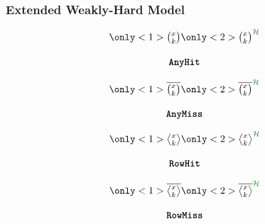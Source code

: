 \begin{frame}
    \frametitle{Extended Weakly-Hard Model}
    \begin{minipage}[c]{0.23\textwidth}
        \centering
        \begin{equation*}
            \begin{matrix}
                \only<1>{\Large \anyhit{}}%
                \only<2>{\Large \anyhit{}^{\textcolor{lqgcolour}{\strat}}}\\
                            \\
                \tAH{}
            \end{matrix}
        \end{equation*}\newline
    \end{minipage}\hfill
    \begin{minipage}[c]{0.23\textwidth}
        \centering
        \begin{equation*}
            \begin{matrix}
                \only<1>{\Large \anymiss{}}%
                \only<2>{\Large \anymiss{}^{\textcolor{lqgcolour}{\strat}}}\\
                            \\
                \tAM{}
            \end{matrix}
        \end{equation*}\newline
    \end{minipage}\hfill
    \begin{minipage}[c]{0.23\textwidth}
        \centering
        \begin{equation*}
            \begin{matrix}
                \only<1>{\Large \rowhit{}}%
                \only<2>{\Large \rowhit{}^{\textcolor{lqgcolour}{\strat}}}\\
                            \\
                \tRH{}
            \end{matrix}
        \end{equation*}\newline
    \end{minipage}\hfill
    \begin{minipage}[c]{0.23\textwidth}
        \centering
        \begin{equation*}
            \begin{matrix}
                \only<1>{\Large \rowmiss{}}%
                \only<2>{\Large \rowmiss{}^{\textcolor{lqgcolour}{\strat}}}\\
                            \\
                \tRM{}
            \end{matrix}
        \end{equation*}\newline
    \end{minipage}


\end{frame}
